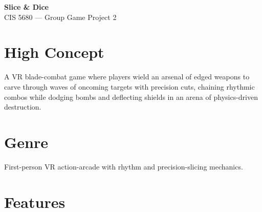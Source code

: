 \documentclass[12pt]{article}
\begin{document}
\begin{center}
    {\LARGE \textbf{Slice \& Dice}}\\[0.3em]
    {\large CIS 5680 --- Group Game Project 2}
\end{center}

\section{High Concept}

A VR blade-combat game where players wield an arsenal of edged weapons to carve through waves of oncoming targets with precision cuts, chaining rhythmic combos while dodging bombs and deflecting shields in an arena of physics-driven destruction.

\section{Genre}

First-person VR action-arcade with rhythm and precision-slicing mechanics.

\section{Features}
\end{document}

